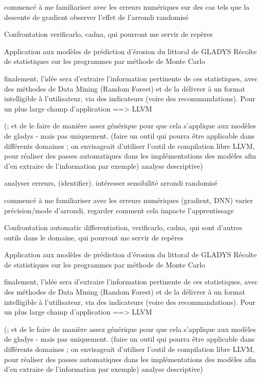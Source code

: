 \documentclass[a4paper,11pt]{article}
\begin{document}
commencé à me familiariser avec les erreurs numériques sur des cas tels que la descente de gradient
observer l’effet de l’arrondi randomisé

Confrontation
verificarlo, cadna, qui pourront me servir de repères

Application aux modèles de prédiction d’érosion du littoral de GLADYS
Récolte de statistiques sur les programmes par méthode de Monte Carlo

finalement, l’idée sera d’extraire l’information pertinente de ces statistiques, avec des méthodes de Data Mining (Random Forest)
et de la délivrer à un format intelligible à l’utilisateur, via des indicateurs (voire des recommandations).
Pour un plus large champ d’application  ==> LLVM

 (; et de le faire de manière assez générique pour que cela s’applique aux modèles de gladys - mais pas uniquement.
(faire un outil qui pourra être applicable dans différents domaines ; on envisageait d’utiliser l’outil de compilation libre LLVM, pour réaliser des passes automatiques dans les implémentations des modèles afin d’en extraire de l’information par exemple)
analyse descriptive)


analyser erreurs, (identifier).
intéresser sensibilité arrondi randomisé

commencé à me familiariser avec les erreurs numériques (gradient, DNN)
varier précision/mode d’arrondi, regarder comment cela impacte l’apprentissage

Confrontation
automatic differentiation, verificarlo, cadna, qui sont d’autres outils dans le domaine, qui pourront me servir de repères

Application aux modèles de prédiction d’érosion du littoral de GLADYS
Récolte de statistiques sur les programmes par méthode de Monte Carlo

finalement, l’idée sera d’extraire l’information pertinente de ces statistiques, avec des méthodes de Data Mining (Random Forest)
et de la délivrer à un format intelligible à l’utilisateur, via des indicateurs (voire des recommandations).
Pour un plus large champ d’application ==> LLVM

 (; et de le faire de manière assez générique pour que cela s’applique aux modèles de gladys - mais pas uniquement.
(faire un outil qui pourra être applicable dans différents domaines ; on envisageait d’utiliser l’outil de compilation libre LLVM, pour réaliser des passes automatiques dans les implémentations des modèles afin d’en extraire de l’information par exemple)
analyse descriptive)
\end{document}
